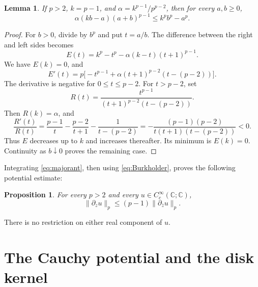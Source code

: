 \documentclass[11pt]{article}
\newtheorem{lemma}[theorem]{Lemma}
\newtheorem{proposition}[theorem]{Proposition}
\newcommand{\C}{\mathbb C}
\newcommand{\dz}{\partial_z}
\newcommand{\db}{\partial_{\bar z}}
\begin{document}
\begin{lemma}\label{lem:majorant}
If \(p>2\), \(k=p-1\), and
\(\alpha=k^{p-1}/p^{p-2}\), then for every \(a,b\ge0\),
\begin{equation}\label{eq:majorant}
 \alpha(kb-a)(a+b)^{p-1}\le k^p b^p-a^p .
\end{equation}
\end{lemma}

\begin{proof}
For \(b>0\), divide by \(b^p\) and put \(t=a/b\).
The difference between the right and left sides becomes
\[
 E(t)=k^p-t^p-\alpha(k-t)(t+1)^{p-1}.
\]
We have \(E(k)=0\), and
\[
 E'(t)=p\bigl[-t^{p-1}
          +\alpha(t+1)^{p-2}(t-(p-2))\bigr].
\]
The derivative is negative for \(0\le t\le p-2\).
For \(t>p-2\), set
\[
 R(t)=\frac{t^{p-1}}{(t+1)^{p-2}(t-(p-2))}.
\]
Then \(R(k)=\alpha\), and
\[
 \frac{R'(t)}{R(t)}
 =\frac{p-1}{t}-\frac{p-2}{t+1}-\frac1{t-(p-2)}
 =-\frac{(p-1)(p-2)}{t(t+1)(t-(p-2))}<0.
\]
Thus \(E\) decreases up to \(k\) and increases thereafter.
Its minimum is \(E(k)=0\). Continuity as \(b\downarrow0\)
proves the remaining case.
\end{proof}

Integrating \eqref{eq:majorant}, then using \eqref{eq:Burkholder},
proves the following potential estimate:
\begin{proposition}\label{prop:potential}
For every \(p>2\) and every \(u\in C_c^\infty(\C;\C)\),
\begin{equation}\label{eq:potential}
 \|\dz u\|_p\le(p-1)\|\db u\|_p .
\end{equation}
\end{proposition}
There is no restriction on either real component of \(u\).

\section{The Cauchy potential and the disk kernel}
\end{document}
